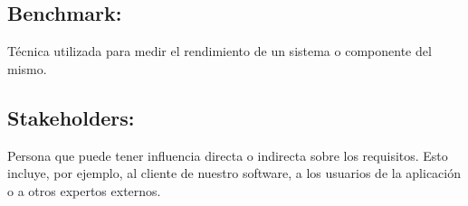 \documentclass[spanish,a4paper,11pt, twoside]{report}	%
\begin{document}
\subsection{Benchmark:} Técnica utilizada para medir el rendimiento de un sistema o componente del mismo.
\subsection{Stakeholders:} Persona que puede tener influencia directa o indirecta sobre los requisitos. Esto incluye, por ejemplo, al cliente de nuestro software, a los usuarios de la aplicación o a otros expertos externos.


\newpage
\mbox{}
\thispagestyle{empty}						%
\newpage

\end{document}
